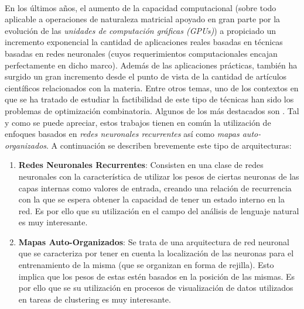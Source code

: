 \documentclass{subfiles}
\begin{document}
        \paragraph{}
        En los últimos años, el aumento de la capacidad computacional (sobre todo aplicable a operaciones de naturaleza matricial apoyado en gran parte por la evolución de las \emph{unidades de computación gráficas (GPUs)}) a propiciado un incremento exponencial la cantidad de aplicaciones reales basadas en técnicas basadas en redes neuronales (cuyos requerimientos computacionales encajan perfectamente en dicho marco). Además de las aplicaciones prácticas, también ha surgido un gran incremento desde el punto de vista de la cantidad de artículos científicos relacionados con la materia. Entre otros temas, uno de los contextos en que se ha tratado de estudiar la factibilidad de este tipo de técnicas han sido los problemas de optimización combinatoria. Algunos de los más destacados son \cite{potvin1993state,ghaziri2003neural,leung2004expanding,masutti2009self,bello2016neural}. Tal y como se puede apreciar, estos trabajos tienen en común la utilización de enfoques basados en \emph{redes neuronales recurrentes} así como \emph{mapas auto-organizados}. A continuación se describen brevemente este tipo de arquitecturas:

        \begin{enumerate}

            \item \textbf{Redes Neuronales Recurrentes}: Consisten en una clase de redes neuronales con la característica de utilizar los pesos de ciertas neuronas de las capas internas como valores de entrada, creando una relación de recurrencia con la que se espera obtener la capacidad de tener un estado interno en la red. Es por ello que su utilización en el campo del análisis de lenguaje natural es muy interesante.

            \item \textbf{Mapas Auto-Organizados}: Se trata de una arquitectura de red neuronal que se caracteriza por tener en cuenta la localización de las neuronas para el entrenamiento de la misma (que se organizan en forma de rejilla). Esto implica que los pesos de estas estén basados en la posición de las mismas. Es por ello que se su utilización en procesos de visualización de datos utilizados en tareas de clustering es muy interesante.

        \end{enumerate}
\end{document}
